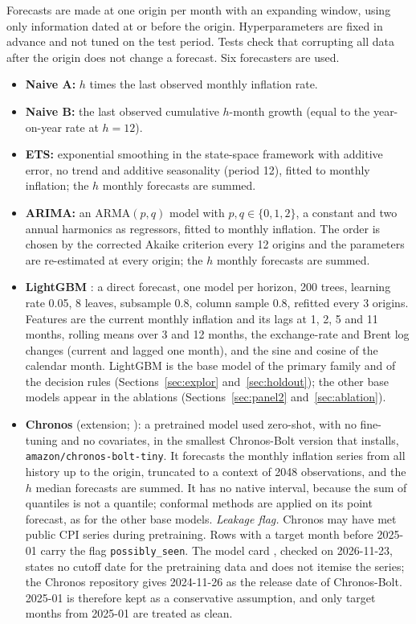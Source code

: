 Forecasts are made at one origin per month with an expanding window, using only information dated at or before the origin. Hyperparameters are fixed in advance and not tuned on the test period. Tests check that corrupting all data after the origin does not change a forecast. Six forecasters are used.
\begin{itemize}
\item \textbf{Naive A:} $h$ times the last observed monthly inflation rate.
\item \textbf{Naive B:} the last observed cumulative $h$-month growth (equal to the year-on-year rate at $h=12$).
\item \textbf{ETS:} exponential smoothing in the state-space framework \citep{hyndman2002ets} with additive error, no trend and additive seasonality (period 12), fitted to monthly inflation; the $h$ monthly forecasts are summed.
\item \textbf{ARIMA:} an ARMA$(p,q)$ model with $p,q\in\{0,1,2\}$, a constant and two annual harmonics as regressors, fitted to monthly inflation. The order is chosen by the corrected Akaike criterion \citep{hurvich1989aicc} every 12 origins and the parameters are re-estimated at every origin; the $h$ monthly forecasts are summed.
\item \textbf{LightGBM} \citep{ke2017lightgbm}: a direct forecast, one model per horizon, 200 trees, learning rate 0.05, 8 leaves, subsample 0.8, column sample 0.8, refitted every 3 origins. Features are the current monthly inflation and its lags at 1, 2, 5 and 11 months, rolling means over 3 and 12 months, the exchange-rate and Brent log changes (current and lagged one month), and the sine and cosine of the calendar month. LightGBM is the base model of the primary family and of the decision rules (Sections~\ref{sec:explor} and~\ref{sec:holdout}); the other base models appear in the ablations (Sections~\ref{sec:panel2} and~\ref{sec:ablation}).
\item \textbf{Chronos} (extension; \citealp{ansari2024chronos}): a pretrained model used zero-shot, with no fine-tuning and no covariates, in the smallest Chronos-Bolt version that installs, \texttt{amazon/chronos-bolt-tiny}. It forecasts the monthly inflation series from all history up to the origin, truncated to a context of 2048 observations, and the $h$ median forecasts are summed. It has no native interval, because the sum of quantiles is not a quantile; conformal methods are applied on its point forecast, as for the other base models. \emph{Leakage flag.} Chronos may have met public CPI series during pretraining. Rows with a target month before 2025-01 carry the flag \texttt{possibly\_seen}. The model card \citep{amazon2024chronosbolt}, checked on 2026-11-23, states no cutoff date for the pretraining data and does not itemise the series; the Chronos repository gives 2024-11-26 as the release date of Chronos-Bolt. 2025-01 is therefore kept as a conservative assumption, and only target months from 2025-01 are treated as clean.
\end{itemize}
